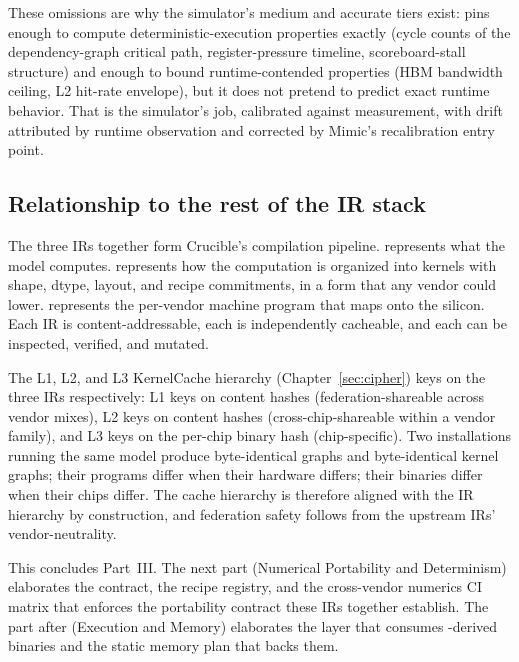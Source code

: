 These omissions are why the simulator's medium and accurate tiers exist:  pins enough to compute deterministic-execution properties exactly (cycle counts of the dependency-graph critical path, register-pressure timeline, scoreboard-stall structure) and enough to bound runtime-contended properties (HBM bandwidth ceiling, L2 hit-rate envelope), but it does not pretend to predict exact runtime behavior.
That is the simulator's job, calibrated against measurement, with drift attributed by runtime observation and corrected by Mimic's recalibration entry point.

\subsection{Relationship to the rest of the IR stack}
\label{sec:ir003-stack-summary}

The three IRs together form Crucible's compilation pipeline.
 represents what the model computes.
 represents how the computation is organized into kernels with shape, dtype, layout, and recipe commitments, in a form that any vendor could lower.
 represents the per-vendor machine program that maps onto the silicon.
Each IR is content-addressable, each is independently cacheable, and each can be inspected, verified, and mutated.

The L1, L2, and L3 KernelCache hierarchy (Chapter~\ref{sec:cipher}) keys on the three IRs respectively: L1 keys on  content hashes (federation-shareable across vendor mixes), L2 keys on  content hashes (cross-chip-shareable within a vendor family), and L3 keys on the per-chip binary hash (chip-specific).
Two installations running the same model produce byte-identical  graphs and byte-identical  kernel graphs; their  programs differ when their hardware differs; their binaries differ when their chips differ.
The cache hierarchy is therefore aligned with the IR hierarchy by construction, and federation safety follows from the upstream IRs' vendor-neutrality.

This concludes Part~III.
The next part (Numerical Portability and Determinism) elaborates the  contract, the recipe registry, and the cross-vendor numerics CI matrix that enforces the portability contract these IRs together establish.
The part after (Execution and Memory) elaborates the  layer that consumes -derived binaries and the static memory plan that backs them.
